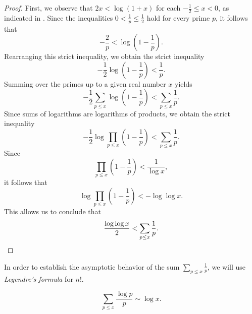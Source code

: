 \begin{proof}
  First, we observe that $2x<\log(1+x)$ for each $-\frac{1}{2}\leq x< 0$, as indicated in . Since the inequalities $0<\frac{1}{p}\leq \frac{1}{2}$ hold for every prime $p$, it follows that
  \begin{equation*}
    -\frac{2}{p}<\log\left(1-\frac{1}{p}\right).
  \end{equation*}
  Rearranging this strict inequality, we obtain the strict inequality
  \begin{equation*}
    -\frac{1}{2}\log\left(1-\frac{1}{p}\right)<\frac{1}{p}.
  \end{equation*}
  Summing over the primes up to a given real number $x$ yields
  \begin{equation*}
    -\frac{1}{2}\sum_{p\leq x}\log\left(1-\frac{1}{p}\right)<\sum_{p\leq x}\frac{1}{p}.
  \end{equation*}
  Since sums of logarithms are logarithms of products, we obtain the strict inequality
  \begin{equation*}
    -\frac{1}{2}\log \prod_{p\leq x}\left(1-\frac{1}{p}\right)<\sum_{p\leq x}\frac{1}{p}.
  \end{equation*}
  Since
  \begin{equation*}
    \prod_{p\leq x}\left(1-\frac{1}{p}\right)<\frac{1}{\log x},
  \end{equation*}
  it follows that
  \begin{equation*}
    \log \prod_{p\leq x}\left(1-\frac{1}{p}\right)<-\log\log x.
  \end{equation*}
  This allows us to conclude that
  \begin{equation*}
    \frac{\log\log x}{2}<\sum_{p\leq x}\frac{1}{p}.\qedhere
  \end{equation*}
\end{proof}

In order to establish the asymptotic behavior of the sum $\sum_{p\leq x}\frac{1}{p}$, we will use \emph{Legendre's formula} for $n!$.

\begin{theorem}
  \begin{equation*}
    \sum_{p\leq x}\frac{\log p}{p} \sim \log x.
  \end{equation*}
\end{theorem}

